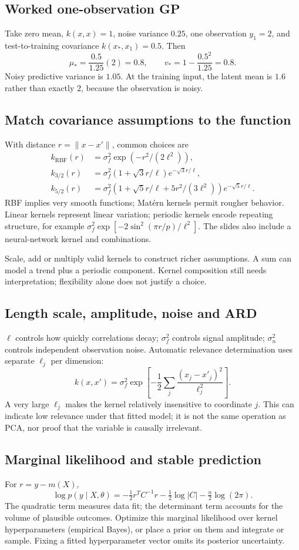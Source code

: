\documentclass[11pt]{article}
\begin{document}
\subsection{Worked one-observation GP}
Take zero mean, $k(x,x)=1$, noise variance $0.25$, one observation $y_1=2$, and test-to-training covariance $k(x_*,x_1)=0.5$. Then
\[
\mu_*=\frac{0.5}{1.25}(2)=0.8,\qquad
v_*=1-\frac{0.5^2}{1.25}=0.8.
\]
Noisy predictive variance is $1.05$. At the training input, the latent mean is $1.6$ rather than exactly $2$, because the observation is noisy.
\subsection{Match covariance assumptions to the function}
With distance $r=\|x-x'\|$, common choices are
\begin{align*}
k_{\mathrm{RBF}}(r)&=\sigma_f^2\exp(-r^2/(2\ell^2)),\\
k_{3/2}(r)&=\sigma_f^2(1+\sqrt3r/\ell)e^{-\sqrt3r/\ell},\\
k_{5/2}(r)&=\sigma_f^2(1+\sqrt5r/\ell+5r^2/(3\ell^2))e^{-\sqrt5r/\ell}.
\end{align*}
RBF implies very smooth functions; Mat\'ern kernels permit rougher behavior. Linear kernels represent linear variation; periodic kernels encode repeating structure, for example $\sigma_f^2\exp[-2\sin^2(\pi r/p)/\ell^2]$. The slides also include a neural-network kernel and combinations.

Scale, add or multiply valid kernels to construct richer assumptions. A sum can model a trend plus a periodic component. Kernel composition still needs interpretation; flexibility alone does not justify a choice.
\subsection{Length scale, amplitude, noise and ARD}
$\ell$ controls how quickly correlations decay; $\sigma_f^2$ controls signal amplitude; $\sigma_n^2$ controls independent observation noise. Automatic relevance determination uses separate $\ell_j$ per dimension:
\[
k(x,x')=\sigma_f^2\exp\!\left[-\frac12\sum_j\frac{(x_j-x'_j)^2}{\ell_j^2}\right].
\]
A very large $\ell_j$ makes the kernel relatively insensitive to coordinate $j$. This can indicate low relevance under that fitted model; it is not the same operation as PCA, nor proof that the variable is causally irrelevant.
\subsection{Marginal likelihood and stable prediction}
For $r=y-m(X)$,
\[
\log p(y\mid X,\theta)=-\tfrac12r^TC^{-1}r-\tfrac12\log|C|-\tfrac n2\log(2\pi).
\]
The quadratic term measures data fit; the determinant term accounts for the volume of plausible outcomes. Optimize this marginal likelihood over kernel hyperparameters (empirical Bayes), or place a prior on them and integrate or sample. Fixing a fitted hyperparameter vector omits its posterior uncertainty.
\end{document}
